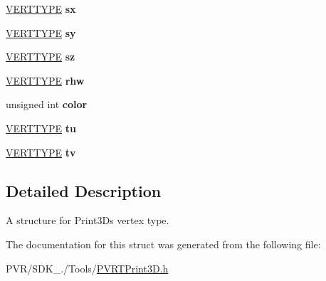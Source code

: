 \begin{DoxyCompactItemize}
\item 
\hypertarget{struct_s_p_v_r_t_print3_d_a_p_i_vertex_a04d1aa89e43c8e3dc34e1eaccfe4e0f5}{\hyperlink{group___a_p_i___o_g_l_e_s_ga06da457b7d3e93368ab904f89e1396be}{V\+E\+R\+T\+T\+Y\+P\+E} {\bfseries sx}}\label{struct_s_p_v_r_t_print3_d_a_p_i_vertex_a04d1aa89e43c8e3dc34e1eaccfe4e0f5}

\item 
\hypertarget{struct_s_p_v_r_t_print3_d_a_p_i_vertex_a502a9ed050315b3c6325267b72a7fbcb}{\hyperlink{group___a_p_i___o_g_l_e_s_ga06da457b7d3e93368ab904f89e1396be}{V\+E\+R\+T\+T\+Y\+P\+E} {\bfseries sy}}\label{struct_s_p_v_r_t_print3_d_a_p_i_vertex_a502a9ed050315b3c6325267b72a7fbcb}

\item 
\hypertarget{struct_s_p_v_r_t_print3_d_a_p_i_vertex_a54c360657a5a444f31fd0fc74f321afc}{\hyperlink{group___a_p_i___o_g_l_e_s_ga06da457b7d3e93368ab904f89e1396be}{V\+E\+R\+T\+T\+Y\+P\+E} {\bfseries sz}}\label{struct_s_p_v_r_t_print3_d_a_p_i_vertex_a54c360657a5a444f31fd0fc74f321afc}

\item 
\hypertarget{struct_s_p_v_r_t_print3_d_a_p_i_vertex_a103b4ba4120ea200df5a29aa66300c87}{\hyperlink{group___a_p_i___o_g_l_e_s_ga06da457b7d3e93368ab904f89e1396be}{V\+E\+R\+T\+T\+Y\+P\+E} {\bfseries rhw}}\label{struct_s_p_v_r_t_print3_d_a_p_i_vertex_a103b4ba4120ea200df5a29aa66300c87}

\item 
\hypertarget{struct_s_p_v_r_t_print3_d_a_p_i_vertex_aeeb6e9d5eb8e5b4560f916b78179e3e7}{unsigned int {\bfseries color}}\label{struct_s_p_v_r_t_print3_d_a_p_i_vertex_aeeb6e9d5eb8e5b4560f916b78179e3e7}

\item 
\hypertarget{struct_s_p_v_r_t_print3_d_a_p_i_vertex_ae19161d4f4d8f9c7c7b72c01960403c7}{\hyperlink{group___a_p_i___o_g_l_e_s_ga06da457b7d3e93368ab904f89e1396be}{V\+E\+R\+T\+T\+Y\+P\+E} {\bfseries tu}}\label{struct_s_p_v_r_t_print3_d_a_p_i_vertex_ae19161d4f4d8f9c7c7b72c01960403c7}

\item 
\hypertarget{struct_s_p_v_r_t_print3_d_a_p_i_vertex_aad342b28b6bcd27d3abdbe8f29c08b19}{\hyperlink{group___a_p_i___o_g_l_e_s_ga06da457b7d3e93368ab904f89e1396be}{V\+E\+R\+T\+T\+Y\+P\+E} {\bfseries tv}}\label{struct_s_p_v_r_t_print3_d_a_p_i_vertex_aad342b28b6bcd27d3abdbe8f29c08b19}

\end{DoxyCompactItemize}


\subsection{Detailed Description}
A structure for Print3\+Ds vertex type. 



 

The documentation for this struct was generated from the following file\+:\begin{DoxyCompactItemize}
\item 
P\+V\+R/\+S\+D\+K\+\_./\+Tools/\hyperlink{_p_v_r_t_print3_d_8h}{P\+V\+R\+T\+Print3\+D.\+h}\end{DoxyCompactItemize}
